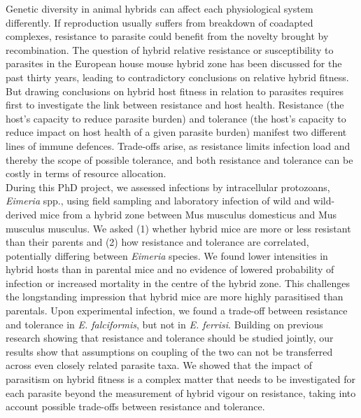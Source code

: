 Genetic diversity in animal hybrids can affect each physiological system differently. If reproduction usually suffers from breakdown of coadapted complexes, resistance to parasite could benefit from the novelty brought by recombination. The question of hybrid relative resistance or susceptibility to parasites in the European house mouse hybrid zone has been discussed for the past thirty years, leading to contradictory conclusions on relative hybrid fitness. But drawing conclusions on hybrid host fitness in relation to parasites requires first to investigate the link between resistance and host health. Resistance (the host’s capacity to reduce parasite burden) and tolerance (the host’s capacity to reduce impact on host health of a given parasite burden) manifest two different lines of immune defences. Trade-offs arise, as resistance limits infection load and thereby the scope of possible tolerance, and both resistance and tolerance can be costly in terms of resource allocation. \\
During this PhD project, we assessed infections by intracellular protozoans, \textit{Eimeria} spp., using field sampling and laboratory infection of wild and wild-derived mice from a hybrid zone between Mus musculus domesticus and Mus musculus musculus. We asked (1) whether hybrid mice are more or less resistant than their parents and (2) how resistance and tolerance are correlated, potentially differing between \textit{Eimeria} species. We found lower intensities in hybrid hosts than in parental mice and no evidence of lowered probability of infection or increased mortality in the centre of the hybrid zone. This challenges the longstanding impression that hybrid mice are more highly parasitised than parentals. Upon experimental infection, we found a trade-off between resistance and tolerance in \textit{E. falciformis}, but not in \textit{E. ferrisi}. Building on previous research showing that resistance and tolerance should be studied jointly, our results show that assumptions on coupling of the two can not be transferred across even closely related parasite taxa. We showed that the impact of parasitism on hybrid fitness is a complex matter that needs to be investigated for each parasite beyond the measurement of hybrid vigour on resistance, taking into account possible trade-offs between resistance and tolerance.
